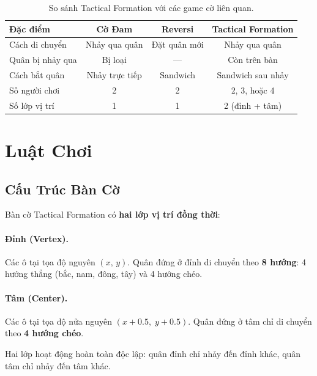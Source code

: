 \documentclass[12pt, a4paper]{article}
\begin{document}
\begin{table}[H]
  \centering
  \caption{So sánh Tactical Formation với các game cờ liên quan.}
  \label{tab:comparison}
  \begin{tabular}{lccc}
    \toprule
    \textbf{Đặc điểm} & \textbf{Cờ Đam} & \textbf{Reversi}
                      & \textbf{Tactical Formation} \\
    \midrule
    Cách di chuyển   & Nhảy qua quân  & Đặt quân mới & Nhảy qua quân \\
    Quân bị nhảy qua & Bị loại        & ---          & Còn trên bàn  \\
    Cách bắt quân    & Nhảy trực tiếp & Sandwich     & Sandwich sau nhảy \\
    Số người chơi    & 2              & 2            & 2, 3, hoặc 4  \\
    Số lớp vị trí    & 1              & 1            & 2 (đỉnh + tâm) \\
    \bottomrule
  \end{tabular}
\end{table}

\section{Luật Chơi}
\label{sec:rules}

\subsection{Cấu Trúc Bàn Cờ}

Bàn cờ Tactical Formation có \textbf{hai lớp vị trí đồng thời}:

\paragraph{Đỉnh (Vertex).}
Các ô tại tọa độ nguyên $(x,\,y)$. Quân đứng ở đỉnh di chuyển theo
\textbf{8 hướng}: 4 hướng thẳng (bắc, nam, đông, tây) và 4 hướng chéo.

\paragraph{Tâm (Center).}
Các ô tại tọa độ nửa nguyên $(x{+}0.5,\;y{+}0.5)$.
Quân đứng ở tâm chỉ di chuyển theo \textbf{4 hướng chéo}.

Hai lớp hoạt động hoàn toàn độc lập: quân đỉnh chỉ nhảy đến đỉnh khác,
quân tâm chỉ nhảy đến tâm khác.
\end{document}
